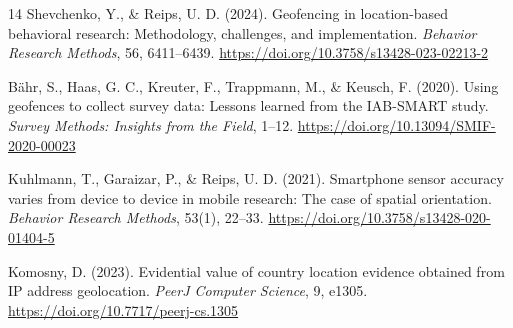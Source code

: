 \documentclass[runningheads]{llncs}
\begin{document}
\begin{thebibliography}{14}
Shevchenko, Y., \& Reips, U. D. (2024). Geofencing in location-based behavioral research: Methodology, challenges, and implementation. \textit{Behavior Research Methods}, 56, 6411--6439. \url{https://doi.org/10.3758/s13428-023-02213-2}

Bähr, S., Haas, G. C., Kreuter, F., Trappmann, M., \& Keusch, F. (2020). Using geofences to collect survey data: Lessons learned from the IAB-SMART study. \textit{Survey Methods: Insights from the Field}, 1--12. \url{https://doi.org/10.13094/SMIF-2020-00023}

Kuhlmann, T., Garaizar, P., \& Reips, U. D. (2021). Smartphone sensor accuracy varies from device to device in mobile research: The case of spatial orientation. \textit{Behavior Research Methods}, 53(1), 22--33. \url{https://doi.org/10.3758/s13428-020-01404-5}

Komosny, D. (2023). Evidential value of country location evidence obtained from IP address geolocation. \textit{PeerJ Computer Science}, 9, e1305. \url{https://doi.org/10.7717/peerj-cs.1305}


\end{thebibliography}
\end{document}
